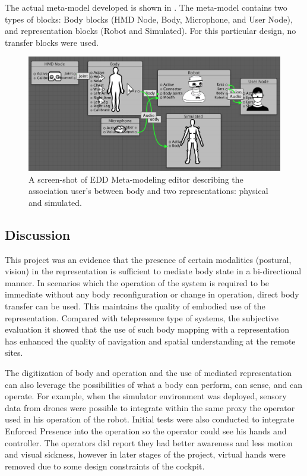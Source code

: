 The actual meta-model developed is shown in . The meta-model contains two types of blocks: Body blocks (HMD Node, Body, Microphone, and User Node), and representation blocks (Robot and Simulated). For this particular design, no transfer blocks were used.


\begin{figure}[htpb]
  \centering
  \captionsetup{justification=centering}
  \includegraphics[width=1\linewidth]{figures/eval/NEDO/ObayashiEDD.png}
  \caption{A screen-shot of EDD Meta-modeling editor describing the association user's between body and two representations: physical and simulated.}
  \label{fig:usability-nedo-metamodel}
\end{figure}



\subsection{Discussion}


This project was an evidence that the presence of certain modalities (postural, vision) in the representation is sufficient to mediate body state in a bi-directional manner. In scenarios which the operation of the system is required to be immediate without any body reconfiguration or change in operation, direct body transfer can be used. This maintains the quality of embodied use of the representation. Compared with telepresence type of systems, the subjective evaluation it showed that the use of such body mapping with a representation has enhanced the quality of navigation and spatial understanding at the remote sites.

The digitization of body and operation and the use of mediated representation can also leverage the possibilities of what a body can perform, can sense, and can operate. For example, when the simulator environment was deployed, sensory data from drones were possible to integrate within the same proxy the operator used in his operation of the robot. Initial tests were also conducted to integrate Enforced Presence into the operation so the operator could see his hands and controller. The operators did report they had better awareness and less motion and visual sickness, however in later stages of the project, virtual hands were removed due to some design constraints of the cockpit.

